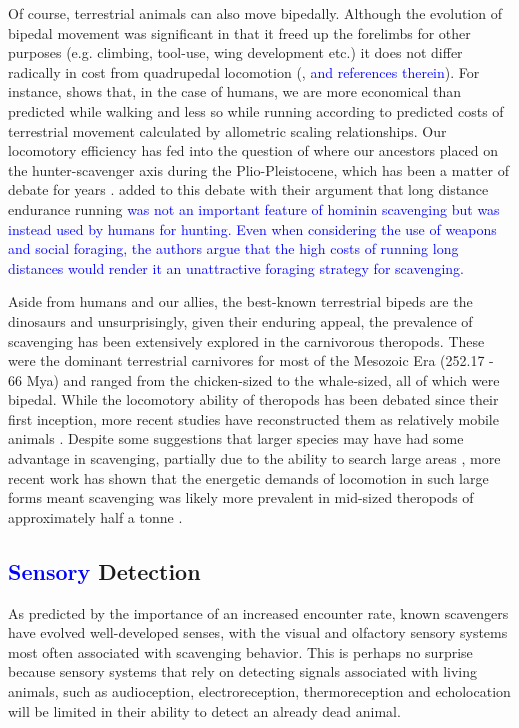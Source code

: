 \documentclass[a4paper,12pt]{article}
\begin{document}
Of course, terrestrial animals can also move bipedally. 
Although the evolution of bipedal movement was significant in that it freed up the forelimbs for other purposes (e.g. climbing, tool-use, wing development etc.) it does not differ radically in cost from quadrupedal locomotion (\cite{williams1999evolution}, \textcolor{blue}{and references therein}). 
For instance, \cite{alexander2004bipedal} shows that, in the case of humans, we are more economical than predicted while walking and less so while running according to predicted costs of terrestrial movement calculated by allometric scaling relationships.
Our locomotory efficiency has fed into the question of where our ancestors placed on the hunter-scavenger axis during the Plio-Pleistocene, which has been a matter of debate for years \citep{dominguez2002hunting}.
\cite{ruxton2013endurance} added to this debate with their argument that long distance endurance running \textcolor{blue}{was not an important feature of hominin scavenging but was instead used by humans for hunting.
Even when considering the use of weapons and social foraging, the authors argue that the high costs of running long distances would render it an unattractive foraging strategy for scavenging.}

Aside from humans and our allies, the best-known terrestrial bipeds are the dinosaurs and unsurprisingly, given their enduring appeal, the prevalence of scavenging has been extensively explored in the carnivorous theropods.
These were the dominant terrestrial carnivores for most of the Mesozoic Era (252.17 - 66 Mya) and ranged from the chicken-sized to the whale-sized, all of which were bipedal.
While the locomotory ability of theropods has been debated since their first inception, more recent studies have reconstructed them as relatively mobile animals \citep{pontzer2009biomechanics}. 
Despite some suggestions that larger species may have had some advantage in scavenging, partially due to the ability to search large areas \citep{ruxton2003could}, more recent work has shown that the energetic demands of locomotion in such large forms meant scavenging was likely more prevalent in mid-sized theropods of approximately half a tonne \citep{kane2016body}.

\subsection{\textcolor{blue}{Sensory} Detection}

As predicted by the importance of an increased encounter rate, known scavengers have evolved well-developed senses, with the visual and olfactory sensory systems most often associated with scavenging behavior. 
This is perhaps no surprise because sensory systems that rely on detecting signals associated with living animals, such as audioception, electroreception, thermoreception and echolocation will be limited in their ability to detect an already dead animal.
\end{document}
